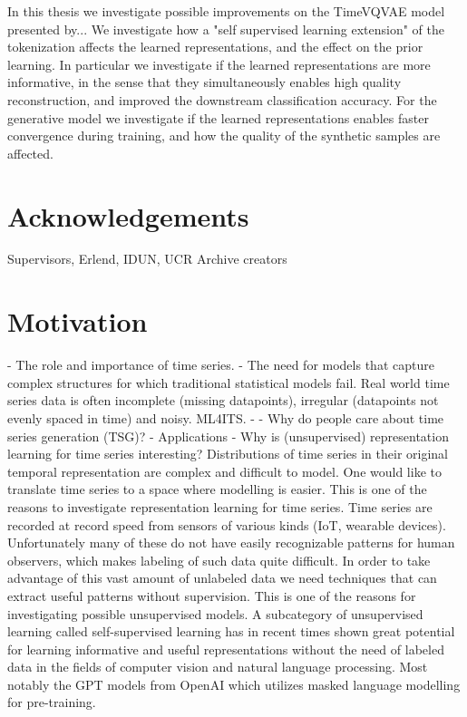 \documentclass[../../thesis.tex]{subfiles}
\begin{document}
In this thesis we investigate possible improvements on the TimeVQVAE model presented by... We investigate how a "self supervised learning extension" of the tokenization affects the learned representations, and the effect on the prior learning. In particular we investigate if the learned representations are more informative, in the sense that they simultaneously enables high quality reconstruction, and improved the downstream classification accuracy. For the generative model we investigate if the learned representations enables faster convergence during training, and how the quality of the synthetic samples are affected. \\

\section{Acknowledgements}
Supervisors, Erlend, IDUN, UCR Archive creators

\section{Motivation}
	- The role and importance of time series.
	- The need for models that capture complex structures for which traditional statistical models fail. 
Real world time series data is often incomplete (missing datapoints), irregular (datapoints not evenly spaced in time) and noisy. 
	ML4ITS. 
	- 
	- Why do people care about time series generation (TSG)?
		- Applications
	- Why is (unsupervised) representation learning for time series interesting?
Distributions of time series in their original temporal representation are complex and difficult to model. One would like to translate time series to a space where modelling is easier. This is one of the reasons to investigate representation learning for time series. Time series are recorded at record speed from sensors of various kinds (IoT, wearable devices). Unfortunately many of these do not have easily recognizable patterns for human observers, which makes labeling of such data quite difficult. In order to take advantage of this vast amount of unlabeled data we need techniques that can extract useful patterns without supervision. This is one of the reasons for investigating possible unsupervised models. A subcategory of unsupervised learning called self-supervised learning has in recent times shown great potential for learning informative and useful representations without the need of labeled data in the fields of computer vision and natural language processing. Most notably the GPT models from OpenAI which utilizes masked language modelling for pre-training. 
\end{document}
